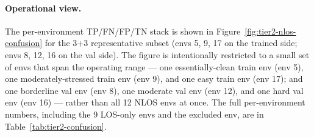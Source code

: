 \paragraph{Operational view.}
The per-environment TP/FN/FP/TN stack is shown in
Figure~\ref{fig:tier2-nlos-confusion} for the 3+3
representative subset (envs 5, 9, 17 on the trained side;
envs 8, 12, 16 on the val side). The figure is
intentionally
restricted to a small set of envs that span the operating
range --- one essentially-clean train env (env 5), one
moderately-stressed train env (env 9), and one easy
train env (env 17); and one borderline val env (env 8),
one moderate val env (env 12), and one hard val env (env 16)
--- rather than all 12 NLOS envs at once. The full
per-environment numbers, including the 9 LOS-only envs and
the excluded env, are in
Table~\ref{tab:tier2-confusion}.



